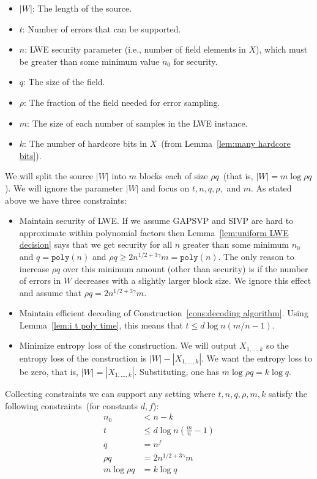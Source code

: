 \documentclass[11pt]{article}
\newcommand{\lemref}[1]{\mbox{Lemma~\ref{#1}}}
\newcommand{\poly}{\ensuremath{\mathtt{poly}}\xspace}
\begin{document}
\begin{itemize}
\item $|W|$: The length of the source.  
\item $t$: Number of errors that can be supported.  
\item $n$: LWE security parameter (i.e., number of field elements in $X$), which must be greater than some minimum value $n_0$ for security.
\item $q$: The size of the field.  
\item $\rho$: The fraction of the field needed for error sampling.  
\item $m$: The size of each number of samples in the LWE instance.  
\item $k$: The number of hardcore bits in $X$~(from \lemref{lem:many hardcore bits}).
\end{itemize}
We will split the source $|W|$ into $m$ blocks each of size $\rho q$~(that is, $|W| = m\log \rho q$).  We will ignore the parameter $|W|$ and focus on $t, n, q, \rho,$ and $m$.  As stated above we have three constraints:
\begin{itemize}
\item Maintain security of LWE.  If we assume GAPSVP and SIVP are hard to approximate within polynomial factors then \lemref{lem:uniform LWE decision} says that we get security for all $n$ greater than some minimum $n_0$ and $q = \poly(n)$ and $\rho q \geq 2 n^{1/2 + 3\gamma} m = \poly(n)$.  The only reason to increase $\rho q$ over this minimum amount (other than security) is if the number of errors in $W$ decreases with a slightly larger block size.  We ignore this effect and assume that $\rho q = 2n^{1/2+3\gamma}m$.
\item Maintain efficient decoding of Construction~\ref{cons:decoding algorithm}.  Using \lemref{lem:i t poly time}, this means that $t\leq d\log n(m/n-1)$.
\item Minimize entropy loss of the construction.  We will output $X_{1,...,k}$ so the entropy loss of the construction is $|W|-|X_{1,..., k}|$.  We want the entropy loss to be zero, that is, $|W| = |X_{1,..., k}|$.  Substituting, one has $m\log \rho q = k \log q$.
\end{itemize}
Collecting constraints we can support any setting where $t, n, q, \rho, m, k$ satisfy the following constraints~(for constants $d, f$):
\begin{align*}
n_0&< n -k \\
t&\leq d \log n\left(\frac{m}{n}-1\right)\\
q &= n^f\\
\rho q  &= 2n^{1/2+3\gamma}m\\
m\log \rho q &= k \log q
\end{align*}
\end{document}
